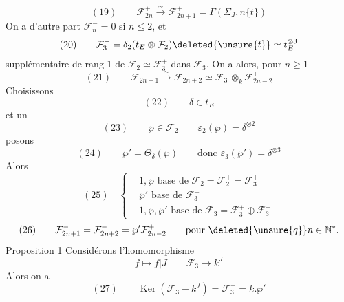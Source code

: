\[
(19)\qquad\mathcal F_{2n}^+\xrightarrow{\sim}\mathcal F_{2n+1}^+
=\Gamma(\Sigma_J,n\{t\})
\]
On a d'autre part $\mathcal F_n^-=0$ si $n\leq2$, et
\[
(20)\qquad\mathcal F_3^-=\delta_2(t_E\otimes\mathcal F_2)\deleted{\unsure{t}}\simeq t_E^{\otimes3}
\]
supplémentaire de rang $1$ de $\mathcal F_2\simeq\mathcal F_3^+$ dans $\mathcal F_3$.
On a alors, pour  $n\geq1$
\[
(21)\qquad\mathcal F_{2n+1}^-\xrightarrow{\sim}\mathcal F_{2n+2}^-
\simeq\mathcal F_3^-\otimes_k\mathcal F_{2n-2}^+
\]
Choisissons
\[
(22)\qquad\delta\in t_E
\]
et un
\[
(23)\qquad\wp\in\mathcal F_2\qquad\varepsilon_2(\wp)=\delta^{\otimes2}
\]
posons
\[
(24)\qquad\wp'=\Theta_\delta(\wp)\qquad\text{donc }\varepsilon_3(\wp')=\delta^{\otimes3}
\]
Alors
\[
(25)\quad\left\{\begin{aligned}
&1,\wp\text{ base de }\mathcal F_2=\mathcal F_2^+=\mathcal F_3^+\\
&\wp'\text{ base de }\mathcal F_3^-\\
&1,\wp,\wp'\text{ base de }\mathcal F_3=\mathcal F_3^+\oplus\mathcal F_3^-
\end{aligned}\right.
\]
\[
(26)\qquad\mathcal F_{2n+1}^-=\mathcal F_{2n+2}^-=\wp'\mathcal F_{2n-2}^+
\qquad\text{pour }\deleted{\unsure{q}}n\in\mathbb N^*.
\]
\uline{Proposition 1} Considérons l'homomorphisme
\[
f\longmapsto f|J\qquad\mathcal F_3\longrightarrow k^J
\]
Alors on a
\[
(27)\qquad\operatorname{Ker}(\mathcal F_3\mathbin{-}k^J)=\mathcal F_3^-=k.\wp'
\]
